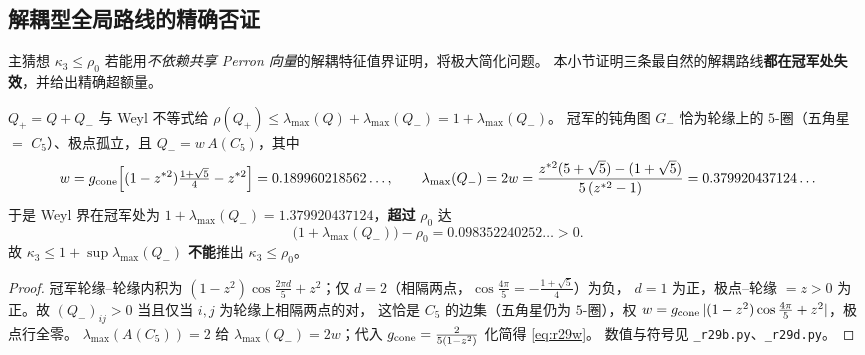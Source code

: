 \subsection{解耦型全局路线的精确否证}\label{sec:r29:weyl}

主猜想 $\kappa_3\le\rho_0$ 若能用\emph{不依赖共享 Perron 向量}的解耦特征值界证明，将极大简化问题。
本小节证明三条最自然的解耦路线\textbf{都在冠军处失效}，并给出精确超额量。

\begin{proposition}\label{prop:r29weyl}
$Q_+=Q+Q_-$ 与 Weyl 不等式给 $\rho(Q_+)\le\lambda_{\max}(Q)+\lambda_{\max}(Q_-)=1+\lambda_{\max}(Q_-)$。
冠军的钝角图 $G_-$ 恰为轮缘上的 $5$-圈（五角星 $=$ $C_5$）、极点孤立，且 $Q_-=w\,A(C_5)$，其中
\begin{equation}\label{eq:r29w}
w=g_{\rm cone}\Bigl[(1-z^{*2})\tfrac{1+\sqrt5}4-z^{*2}\Bigr]=0.189960218562\ldots,\qquad
\lambda_{\max}(Q_-)=2w=\frac{z^{*2}(5+\sqrt5)-(1+\sqrt5)}{5\,(z^{*2}-1)}=0.379920437124\ldots
\end{equation}
于是 Weyl 界在冠军处为 $1+\lambda_{\max}(Q_-)=1.379920437124$，\textbf{超过} $\rho_0$ 达
\begin{equation}\label{eq:r29over}
\bigl(1+\lambda_{\max}(Q_-)\bigr)-\rho_0=0.098352240252\ldots>0 .
\end{equation}
故 $\kappa_3\le1+\sup\lambda_{\max}(Q_-)$ \textbf{不能}推出 $\kappa_3\le\rho_0$。
\end{proposition}
\begin{proof}
冠军轮缘--轮缘内积为 $(1-z^2)\cos\frac{2\pi d}5+z^2$；仅 $d=2$（相隔两点，$\cos\frac{4\pi}5=-\frac{1+\sqrt5}4$）为负，
$d=1$ 为正，极点--轮缘 $=z>0$ 为正。故 $(Q_-)_{ij}>0$ 当且仅当 $i,j$ 为轮缘上相隔两点的对，
这恰是 $C_5$ 的边集（五角星仍为 $5$-圈），权 $w=g_{\rm cone}\,|(1-z^2)\cos\frac{4\pi}5+z^2|$，极点行全零。
$\lambda_{\max}(A(C_5))=2$ 给 $\lambda_{\max}(Q_-)=2w$；代入 $g_{\rm cone}=\frac2{5(1-z^2)}$ 化简得 \eqref{eq:r29w}。
数值与符号见 \texttt{\_r29b.py}、\texttt{\_r29d.py}。
\end{proof}

